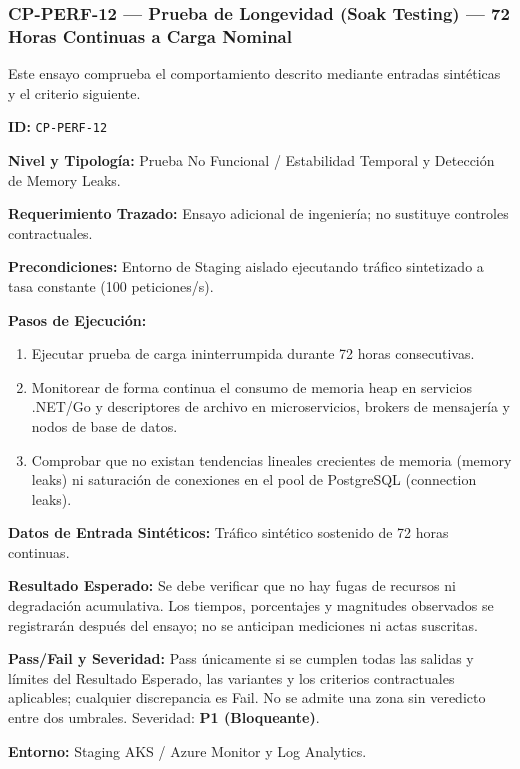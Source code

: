 \subsubsection*{CP-PERF-12 — Prueba de Longevidad (Soak Testing) — 72 Horas Continuas a Carga Nominal}\label{sec:9-cp-perf-12}
Este ensayo comprueba el comportamiento descrito mediante entradas sintéticas y el criterio siguiente.

\par\noindent\textbf{ID:} \texttt{C\allowbreak{}P\allowbreak{}-\allowbreak{}P\allowbreak{}E\allowbreak{}R\allowbreak{}F\allowbreak{}-\allowbreak{}1\allowbreak{}2\allowbreak{}}\par
\par\noindent\textbf{Nivel y Tipología:} Prueba No Funcional / Estabilidad Temporal y Detección de Memory Leaks.\par
\par\noindent\textbf{Requerimiento Trazado:} Ensayo adicional de ingeniería; no sustituye controles contractuales.\par
\par\noindent\textbf{Precondiciones:} Entorno de Staging aislado ejecutando tráfico sintetizado a tasa constante (100 peticiones/s).\par
\par\noindent\textbf{Pasos de Ejecución:} \par
\begin{enumerate}
\item Ejecutar prueba de carga ininterrumpida durante 72 horas consecutivas.
\item Monitorear de forma continua el consumo de memoria heap en servicios .NET/Go y descriptores de archivo en microservicios, brokers de mensajería y nodos de base de datos.
\item Comprobar que no existan tendencias lineales crecientes de memoria (memory leaks) ni saturación de conexiones en el pool de PostgreSQL (connection leaks).
\end{enumerate}
\par\noindent\textbf{Datos de Entrada Sintéticos:} Tráfico sintético sostenido de 72 horas continuas.\par
\par\noindent\textbf{Resultado Esperado:} Se debe verificar que no hay fugas de recursos ni degradación acumulativa. Los tiempos, porcentajes y magnitudes observados se registrarán después del ensayo; no se anticipan mediciones ni actas suscritas.\par
\par\noindent\textbf{Pass/Fail y Severidad:} Pass únicamente si se cumplen todas las salidas y límites del Resultado Esperado, las variantes y los criterios contractuales aplicables; cualquier discrepancia es Fail. No se admite una zona sin veredicto entre dos umbrales. Severidad: \textbf{P1 (Bloqueante)}.\par
\par\noindent\textbf{Entorno:} Staging AKS / Azure Monitor y Log Analytics.\par


